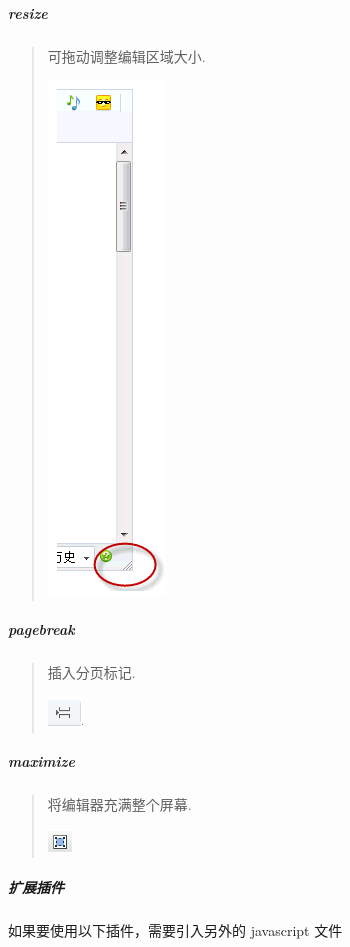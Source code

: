 \documentclass[letterpaper,10pt,english]{sphinxmanual}
\begin{document}
\subparagraph{resize}
\label{relatedproj/editorguide/plugin:resize}\begin{quote}

可拖动调整编辑区域大小.

\includegraphics{resize1.png}
\end{quote}


\subparagraph{pagebreak}
\label{relatedproj/editorguide/plugin:pagebreak}\begin{quote}

插入分页标记.

\includegraphics{pagebreak1.png}
\end{quote}


\subparagraph{maximize}
\label{relatedproj/editorguide/plugin:maximize}\begin{quote}

将编辑器充满整个屏幕.

\includegraphics{maximize1.png}
\end{quote}


\subparagraph{扩展插件}
\label{relatedproj/editorguide/plugin:id2}
如果要使用以下插件，需要引入另外的 javascript 文件
\end{document}
